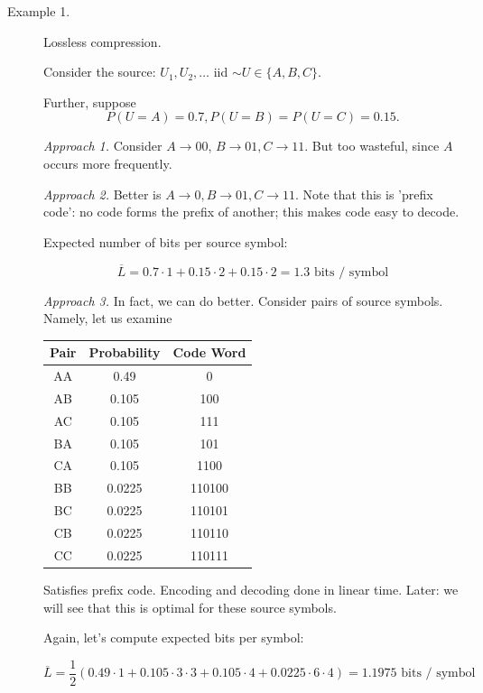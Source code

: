 \documentclass[13pt]{article}
\begin{document}
\begin{description}
  \item[Example 1.] Lossless compression.

    Consider the source: $U_1, U_2, \dots$ iid $\sim U \in \{ A, B, C \}$.

    Further, suppose
    \[
      P(U = A) = 0.7, P(U=B) = P(U=C) = 0.15.
    \]


    {\it Approach 1.} Consider $A \to 00$, $B \to 01, C \to 11$.  But too wasteful, since $A$ occurs more frequently.

    {\it Approach 2.} Better is $A \to 0, B \to 01, C \to 11$.  Note that this is 'prefix code': no code forms the prefix of another; this makes code easy to decode.

    Expected number of bits per source symbol:

    \[
      \overline{L} = 0.7 \cdot 1 + 0.15 \cdot 2 + 0.15 \cdot 2 = 1.3 \text{ bits / symbol}
    \]

    {\it Approach 3.} In fact, we can do better.  Consider pairs of source symbols.  Namely, let us examine 

   
    \begin{center}
      \begin{tabular}{|c|c|c|}
        \hline
        Pair & Probability & Code Word \\ \hline
        AA & 0.49 & 0 \\
        AB & 0.105 & 100\\
        AC & 0.105 & 111 \\
        BA & 0.105 & 101 \\
        CA & 0.105 & 1100 \\
        BB & 0.0225 & 110100 \\
        BC & 0.0225 & 110101 \\ 
        CB & 0.0225 & 110110 \\
        CC & 0.0225 & 110111 \\ \hline
      \end{tabular}
    \end{center}

    Satisfies prefix code.  Encoding and decoding done in linear time.  Later: we will see that this is optimal for these source symbols.

    Again, let's compute expected bits per symbol:

    \[
      \overline{L} = \frac{1}{2} (0.49 \cdot 1 + 0.105 \cdot 3 \cdot 3 + 0.105 \cdot 4 + 0.0225 \cdot 6 \cdot 4) = 1.1975 \text{ bits / symbol}
    \]


\end{description}
\end{document}
